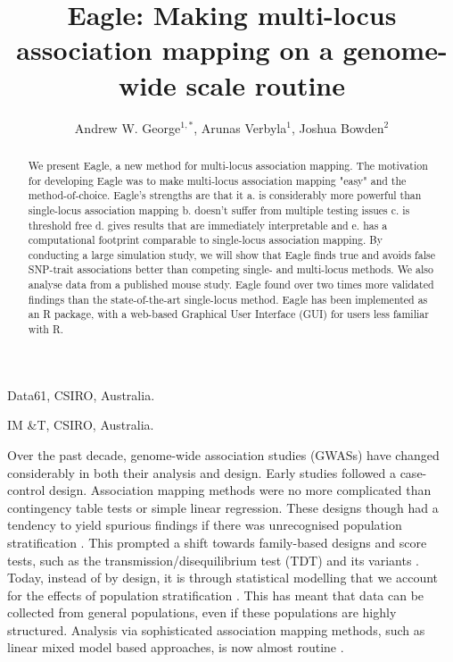\documentclass{nature}
\begin{document}
\title{Eagle: Making multi-locus association mapping on a genome-wide scale routine}
\author{Andrew W. George$^{1,*}$, Arunas Verbyla$^1$, Joshua Bowden$^2$}

\maketitle


\newcommand{\bwidetildea}{\widetilde{\bm{a}}}
\newcommand{\bu}{\bm{u}}
\newcommand{\be}{\bm{e}}
\newcommand{\btau}{\bm{\tau}}
\newcommand{\ba}{\bm{a}}
\newcommand{\bzero}{\bm{0}}
\newcommand{\bI}{\bm{I}}
\newcommand{\bX}{\bm{X}}
\newcommand{\by}{\bm{y}}
\newcommand{\bZ}{\bm{Z}}
\newcommand{\bM}{\bm{M}}
\newcommand{\bmm}{\bm{m}}


\begin{affiliations}
\item Data61, CSIRO, Australia.
\item IM \&T, CSIRO, Australia.
\end{affiliations}

\begin{abstract}
We present Eagle, a new method for multi-locus association mapping. The
motivation for developing Eagle was to make multi-locus association mapping "easy" and the method-of-choice. 
Eagle's strengths are that it a. is considerably more powerful than single-locus association mapping b. doesn't suffer from multiple testing issues c. is threshold free d. gives results that are immediately interpretable and e. has a computational footprint comparable to single-locus association mapping. 
By conducting a large simulation study, we will show that Eagle finds true and avoids false SNP-trait associations better than competing single- and 
multi-locus methods. We also analyse data from a published mouse study. Eagle found over two times more validated findings than the state-of-the-art 
single-locus method. 
Eagle has been implemented as an R package, with a web-based Graphical User Interface (GUI) for users less familiar with R.
\end{abstract}


Over the past decade,  genome-wide association studies (GWASs) have changed considerably in both their analysis and design. Early studies
 followed a case-control design. Association mapping methods were no more complicated than contingency table tests or simple 
linear regression. These designs though had a tendency to yield spurious findings if there was unrecognised population stratification 
\cite{cardon2003population}. This prompted a shift towards family-based designs and score tests, such as the transmission/disequilibrium test (TDT)  and its variants \cite{spielman1996tdt}. Today, instead of by design, it is through statistical modelling that we account for the effects of population stratification \cite{price2010new}. This has meant that data can be collected from general populations, even if these populations are highly structured. Analysis via sophisticated association mapping methods, such as linear mixed model based approaches,  is now almost routine \cite{purcell2007plink, bradbury2007tassel}.
\end{document}
